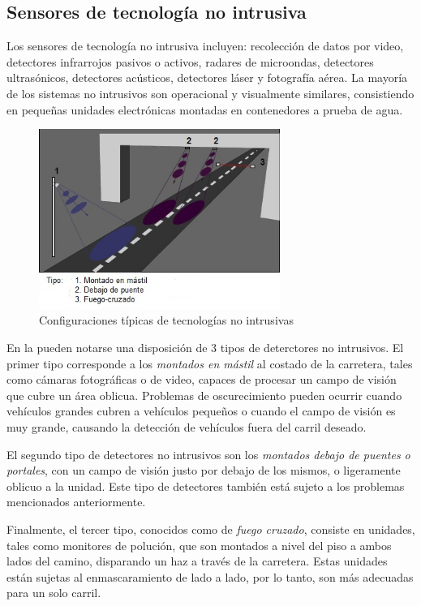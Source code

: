 \subsection{Sensores de tecnología no intrusiva}

Los sensores de tecnología no intrusiva incluyen:  recolección de datos por video, detectores infrarrojos pasivos o activos, radares de microondas, detectores ultrasónicos, detectores acústicos, detectores láser y fotografía aérea. La mayoría de los sistemas no intrusivos son operacional y visualmente similares, consistiendo en pequeñas unidades electrónicas montadas en contenedores a prueba de agua.

\begin{figure}[h]
	\centering
	\includegraphics[width=0.7\textwidth]{capitulos/3/figuras/figura3.jpg}
	\caption{\label{fig:noIntrusica}  Configuraciones típicas de tecnologías no intrusivas}	
\end{figure}

En la  pueden notarse una disposición de 3 tipos de deterctores no intrusivos. El primer tipo corresponde a los \emph{montados en mástil} al costado de la carretera, tales como cámaras fotográficas o de video, capaces de procesar un campo de visión que cubre un área oblicua.  Problemas de oscurecimiento pueden ocurrir cuando vehículos grandes cubren a vehículos pequeños o cuando el campo de visión es muy grande, causando la detección de vehículos fuera del carril deseado.

El segundo tipo de detectores no intrusivos son los \emph{montados debajo de puentes o portales}, con un campo de visión justo por debajo de los mismos, o ligeramente oblicuo a la unidad. Este tipo de detectores también está sujeto a los problemas mencionados anteriormente.

Finalmente, el tercer tipo, conocidos como de \emph{fuego cruzado}, consiste en unidades, tales como monitores de polución, que son montados a nivel del piso a ambos lados del camino, disparando un haz a través de la carretera. Estas unidades están sujetas al enmascaramiento de lado a lado, por lo tanto, son más adecuadas para un solo carril.

